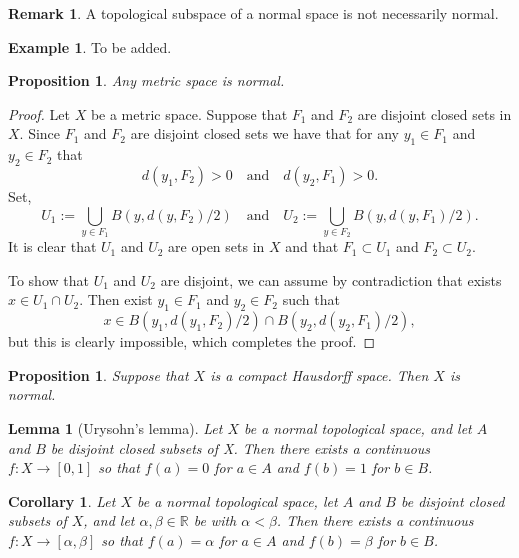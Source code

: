 \documentclass[11pt,a4paper]{article}
\theoremstyle{definition}
\newtheorem{remark}{Remark}[section]
\newtheorem{example}{Example}[section]
\theoremstyle{plain}
\newtheorem{proposition}[theorem]{Proposition}
\newtheorem{lemma}[theorem]{Lemma}
\newtheorem{corollary}[theorem]{Corollary}
\newcommand{\R}{\mathbb{R}}
\newcommand{\tand}{\quad \text{and} \quad}
\begin{document}
  \begin{remark}
    A topological subspace of a normal space is not necessarily normal.
  \end{remark}
  \begin{example}
    To be added.
  \end{example}

  \begin{proposition}
    Any metric space is normal.
  \end{proposition}
  \begin{proof}
    Let $X$ be a metric space.
    Suppose that $F_1$ and $F_2$ are disjoint closed sets in $X$.
    Since $F_1$ and $F_2$ are disjoint closed sets we have that for any
    $y_1 \in F_1$ and $y_2 \in F_2$ that
    \[
      d(y_1,F_2) > 0 \tand d(y_2,F_1) > 0.
    \]
    Set,
    \[
      U_1 := \bigcup_{y \in F_1} B(y,d(y,F_2) / 2) \tand
      U_2 := \bigcup_{y \in F_2} B(y,d(y,F_1) / 2).
    \]
    It is clear that $U_1$ and $U_2$ are open sets in $X$ and that 
    $F_1 \subset U_1$ and $F_2 \subset U_2$.

    To show that $U_1$ and $U_2$ are disjoint, we can assume by contradiction
    that exists $x \in U_1 \cap U_2$. Then exist $y_1 \in F_1$ and
    $y_2 \in F_2$ such that
    \[
      x \in B(y_1,d(y_1,F_2) / 2) \cap B(y_2,d(y_2,F_1) / 2),
    \]
    but this is clearly impossible, which completes the proof.
  \end{proof}

  \begin{proposition}
    Suppose that $X$ is a compact Hausdorff space. Then $X$ is normal.
  \end{proposition}


  \begin{lemma}[Urysohn’s lemma]\label{lem:urysohn}
    Let $X$ be a normal topological space, 
    and let $A$ and $B$ be disjoint closed subsets of X.
    Then there exists a continuous $f \colon X \to [0,1]$
    so that $f(a) = 0$ for $a \in A$ and $f(b) = 1$ for $b \in B$.
  \end{lemma}

  \begin{corollary}
    Let $X$ be a normal topological space, let $A$ and $B$ be disjoint closed 
    subsets of $X$, and let $\alpha, \beta \in \R$ be with $\alpha < \beta$.
    Then there exists a continuous $f \colon X \to [\alpha, \beta]$ 
    so that $f(a) = \alpha$ for $a \in A$ and $f(b) = \beta$ for $b \in B$.
  \end{corollary}
\end{document}
